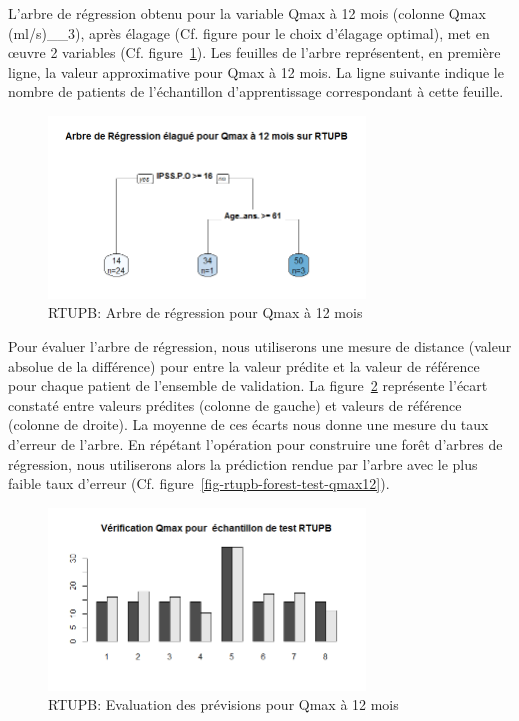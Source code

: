 L'arbre de régression obtenu pour la variable Qmax à 12 mois (colonne Qmax (ml/s)\_\_3), après élagage (Cf. figure pour le choix d'élagage optimal), met en {\oe}uvre 2 variables (Cf. figure~\ref{fig-rtupb-regtree-qmax12}). Les feuilles de l'arbre représentent, en première ligne, la valeur approximative pour Qmax à 12 mois. La ligne suivante indique le nombre de patients de l'échantillon d'apprentissage correspondant à cette feuille. 

\begin{figure}[H]
\centering
\includegraphics[width=0.75\textwidth]{../Fig/RTUPB/rtupb-regtree-qmax12.png}
\caption{RTUPB: Arbre de régression pour Qmax à 12 mois}
\label{fig-rtupb-regtree-qmax12}
\end{figure}

Pour évaluer l'arbre de régression, nous utiliserons une mesure de distance (valeur absolue de la différence) pour entre la valeur prédite et la valeur de référence pour chaque patient de l'ensemble de validation. 
La figure~\ref{fig-rtupb-regtree-test-qmax12} représente l'écart constaté entre valeurs prédites (colonne de gauche) et valeurs de référence (colonne de droite). La moyenne de ces écarts nous donne une mesure du taux d'erreur de l'arbre. En répétant l'opération pour construire une forêt d'arbres de régression, nous utiliserons alors la prédiction rendue par l'arbre avec le plus faible taux d'erreur (Cf. figure~\ref{fig-rtupb-forest-test-qmax12}).

\begin{figure}[H]
\centering
\includegraphics[width=0.75\textwidth]{../Fig/RTUPB/rtupb-regtree-test-qmax12.png}
\caption{RTUPB: Evaluation des prévisions pour Qmax à 12 mois}
\label{fig-rtupb-regtree-test-qmax12}
\end{figure}

